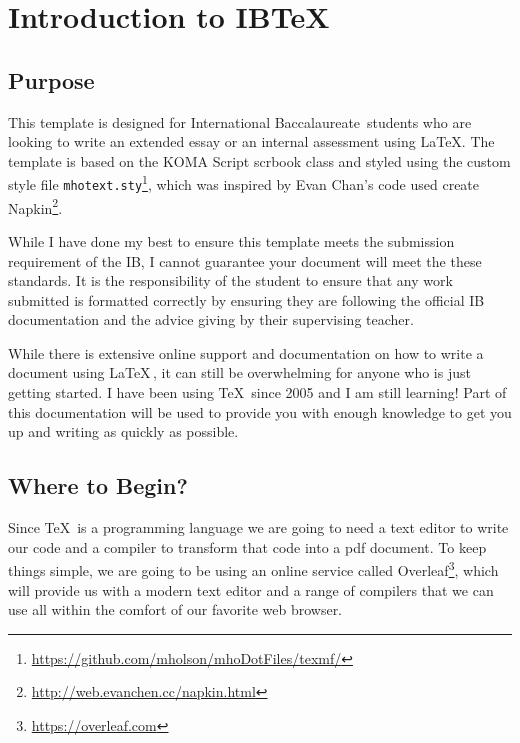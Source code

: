 \chapter{Introduction to IB\TeX}

\section{Purpose}

This template is designed for International Baccalaureate\texttrademark\, 
students who are looking to write an extended essay or an internal assessment 
using \LaTeX.  The template is based on the KOMA Script scrbook class and styled
using the custom style file 
\texttt{mhotext.sty}\footnote{\url{https://github.com/mholson/mhoDotFiles/texmf/}}, 
which was inspired by Evan Chan's code
used create Napkin\footnote{\url{http://web.evanchen.cc/napkin.html}}.

While I have done my best to ensure this template meets the submission
requirement of the IB, I cannot guarantee your document will meet the 
these standards.  It is the responsibility of the student to ensure that any 
work submitted is formatted correctly by ensuring they are following the 
official IB documentation and the advice giving by their supervising teacher.

While there is extensive online support and documentation on how to write
a document using \LaTeX\,, it can still be overwhelming for anyone who is just
getting started.  I have been using \TeX\, since 2005 and I am still
learning!  Part of this documentation will be used to provide you with
enough knowledge to get you up and writing as quickly as possible.


\section{Where to Begin?}

Since \TeX\, is a programming language we are going to need a text editor
to write our code and a compiler to transform that code into a pdf document.
To keep things simple, we are going to be using an online service called 
Overleaf\footnote{\url{https://overleaf.com}}, which will provide us with a 
modern text editor and a range of compilers that we can use all within the 
comfort of our favorite web browser.

